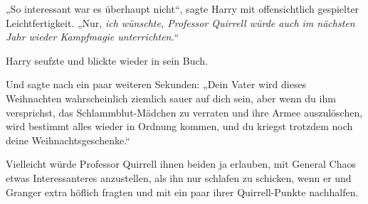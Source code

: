 „So interessant war es überhaupt nicht“, sagte Harry mit offensichtlich gespielter Leichtfertigkeit.
„Nur, \emph{ich wünschte, Professor Quirrell würde auch im nächsten Jahr wieder Kampfmagie unterrichten.}“

Harry seufzte und blickte wieder in sein Buch.

Und sagte nach ein paar weiteren Sekunden:
„Dein Vater wird dieses Weihnachten wahrscheinlich ziemlich sauer auf dich sein, aber wenn du ihm versprichst, das Schlammblut-Mädchen zu verraten und ihre Armee auszulöschen, wird bestimmt alles wieder in Ordnung kommen, und du kriegst trotzdem noch deine Weihnachtsgeschenke.“

Vielleicht würde Professor Quirrell ihnen beiden ja erlauben, mit General Chaos etwas Interessanteres anzustellen, als ihn nur schlafen zu schicken, wenn er und Granger extra höflich fragten und mit ein paar ihrer Quirrell-Punkte nachhalfen.